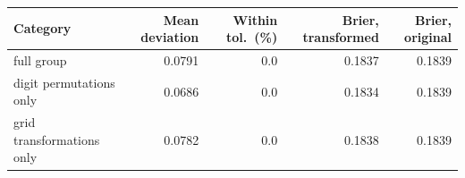 \begin{tabular}{lrrrr}
\toprule
Category & Mean deviation & Within tol.\ (\%) & Brier, transformed & Brier, original \\
\midrule
full group & 0.0791 & 0.0 & 0.1837 & 0.1839 \\
digit permutations only & 0.0686 & 0.0 & 0.1834 & 0.1839 \\
grid transformations only & 0.0782 & 0.0 & 0.1838 & 0.1839 \\
\bottomrule
\end{tabular}
